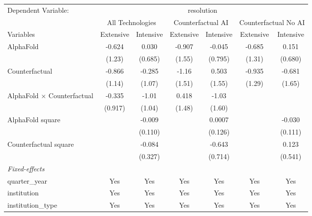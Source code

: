\begingroup
\centering
\begin{tabular}{lcccccc}
   \tabularnewline \midrule \midrule
   Dependent Variable: & \multicolumn{6}{c}{resolution}\\
 & \multicolumn{2}{c}{All Technologies} & \multicolumn{2}{c}{Counterfactual AI} & \multicolumn{2}{c}{Counterfactual No AI} \\
\cmidrule(lr){1-1}\cmidrule(lr){2-3} \cmidrule(lr){4-5} \cmidrule(lr){6-7}
Variables & \multicolumn{1}{c}{Extensive} & \multicolumn{1}{c}{Intensive} & \multicolumn{1}{c}{Extensive} & \multicolumn{1}{c}{Intensive} & \multicolumn{1}{c}{Extensive} & \multicolumn{1}{c}{Intensive} \\
\cmidrule(lr){1-1}\cmidrule(lr){2-2} \cmidrule(lr){3-3} \cmidrule(lr){4-4} \cmidrule(lr){5-5} \cmidrule(lr){6-6} \cmidrule(lr){7-7}
   AlphaFold                          & -0.624  & 0.030   & -0.907 & -0.045  & -0.685 & 0.151\\   
                                      & (1.23)  & (0.685) & (1.55) & (0.795) & (1.31) & (0.680)\\   
   Counterfactual                     & -0.866  & -0.285  & -1.16  & 0.503   & -0.935 & -0.681\\   
                                      & (1.14)  & (1.07)  & (1.51) & (1.55)  & (1.29) & (1.65)\\   
   AlphaFold $\times$ Counterfactual  & -0.335  & -1.01   & 0.418  & -1.03   &        &   \\   
                                      & (0.917) & (1.04)  & (1.48) & (1.60)  &        &   \\   
   AlphaFold square                   &         & -0.009  &        & 0.0007  &        & -0.030\\   
                                      &         & (0.110) &        & (0.126) &        & (0.111)\\   
   Counterfactual square              &         & -0.084  &        & -0.643  &        & 0.123\\   
                                      &         & (0.327) &        & (0.714) &        & (0.541)\\   
   \midrule
   \emph{Fixed-effects}\\
   quarter\_year                      & Yes     & Yes     & Yes    & Yes     & Yes    & Yes\\  
   institution                        & Yes     & Yes     & Yes    & Yes     & Yes    & Yes\\  
   institution\_type                  & Yes     & Yes     & Yes    & Yes     & Yes    & Yes\\  

\end{tabular}
